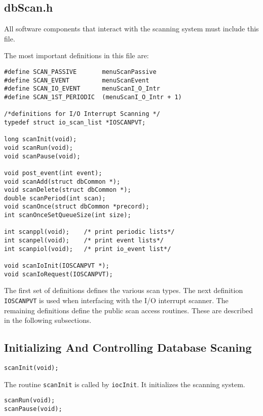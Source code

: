 \subsection{dbScan.h}

All software components that interact with the scanning system must include this file.

The most important definitions in this file are:

\begin{verbatim}
#define SCAN_PASSIVE       menuScanPassive
#define SCAN_EVENT         menuScanEvent
#define SCAN_IO_EVENT      menuScanI_O_Intr
#define SCAN_1ST_PERIODIC  (menuScanI_O_Intr + 1)

/*definitions for I/O Interrupt Scanning */
typedef struct io_scan_list *IOSCANPVT;

long scanInit(void);
void scanRun(void);
void scanPause(void);

void post_event(int event);
void scanAdd(struct dbCommon *);
void scanDelete(struct dbCommon *);
double scanPeriod(int scan);
void scanOnce(struct dbCommon *precord);
int scanOnceSetQueueSize(int size);

int scanppl(void);    /* print periodic lists*/
int scanpel(void);    /* print event lists*/
int scanpiol(void);   /* print io_event list*/

void scanIoInit(IOSCANPVT *);
void scanIoRequest(IOSCANPVT);
\end{verbatim}

The first set of definitions defines the various scan types. The next definition \verb|IOSCANPVT| is used when interfacing with 
the I/O interrupt scanner. The remaining definitions define the public scan access routines. These are described in the 
following subsections.

\subsection{Initializing And Controlling Database Scaning}

\begin{verbatim}
scanInit(void);
\end{verbatim}

The routine \verb|scanInit| is called by \verb|iocInit|. It initializes the scanning system.

\begin{verbatim}
scanRun(void);
scanPause(void);
\end{verbatim}

